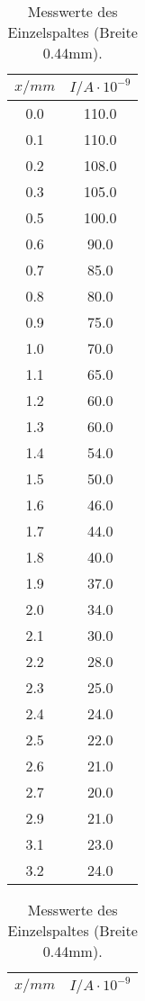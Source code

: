 \begin{table}
    \centering
\caption{Messwerte des Einzelspaltes (Breite 0.44mm).}
\begin{minipage}{0.25\textwidth}
    \centering
	\label{tab:a}
	\begin{tabular}{c|c}
		\toprule
		{$x / mm$} & {$I / A\cdot10^{-9}$} \\
		\hline
        \midrule
        0.0 &110.0\\
        0.1 &110.0\\
        0.2 &108.0\\
        0.3 &105.0\\
        0.5 &100.0\\
        0.6 &90.0\\
        0.7 &85.0\\
        0.8 &80.0\\
        0.9 &75.0\\
        1.0 &70.0\\
        1.1 &65.0\\
        1.2 &60.0\\
        1.3 &60.0\\
        1.4 &54.0\\
        1.5 &50.0\\
        1.6 &46.0\\
        1.7 &44.0\\
        1.8 &40.0\\
        1.9 &37.0\\
        2.0 &34.0\\
        2.1 &30.0\\
        2.2 &28.0\\
        2.3 &25.0\\
        2.4 &24.0\\
        2.5 &22.0\\
        2.6 &21.0\\
        2.7 &20.0\\
        2.9 &21.0\\
        3.1 &23.0\\
        3.2 &24.0\\
		\bottomrule 
	\end{tabular}
\end{minipage}
\begin{minipage}{0.25\textwidth}
    \centering
	\label{tab:b}
	\begin{tabular}{c|c}
		\toprule
		{$x / mm$} & {$I / A\cdot10^{-9}$} \\
		\hline

\end{tabular}
\end{minipage}
\end{table}
